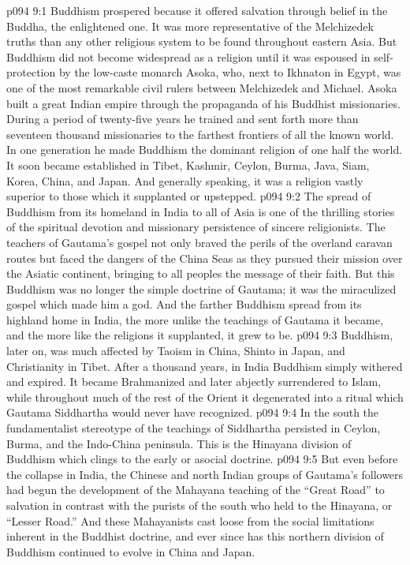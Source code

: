 \vs p094 9:1 Buddhism prospered because it offered salvation through belief in the Buddha, the enlightened one. It was more representative of the Melchizedek truths than any other religious system to be found throughout eastern Asia. But Buddhism did not become widespread as a religion until it was espoused in self\hyp{}protection by the low\hyp{}caste monarch Asoka, who, next to Ikhnaton in Egypt, was one of the most remarkable civil rulers between Melchizedek and Michael. Asoka built a great Indian empire through the propaganda of his Buddhist missionaries. During a period of twenty\hyp{}five years he trained and sent forth more than seventeen thousand missionaries to the farthest frontiers of all the known world. In one generation he made Buddhism the dominant religion of one half the world. It soon became established in Tibet, Kashmir, Ceylon, Burma, Java, Siam, Korea, China, and Japan. And generally speaking, it was a religion vastly superior to those which it supplanted or upstepped.
\vs p094 9:2 The spread of Buddhism from its homeland in India to all of Asia is one of the thrilling stories of the spiritual devotion and missionary persistence of sincere religionists. The teachers of Gautama’s gospel not only braved the perils of the overland caravan routes but faced the dangers of the China Seas as they pursued their mission over the Asiatic continent, bringing to all peoples the message of their faith. But this Buddhism was no longer the simple doctrine of Gautama; it was the miraculized gospel which made him a god. And the farther Buddhism spread from its highland home in India, the more unlike the teachings of Gautama it became, and the more like the religions it supplanted, it grew to be.
\vs p094 9:3 Buddhism, later on, was much affected by Taoism in China, Shinto in Japan, and Christianity in Tibet. After a thousand years, in India Buddhism simply withered and expired. It became Brahmanized and later abjectly surrendered to Islam, while throughout much of the rest of the Orient it degenerated into a ritual which Gautama Siddhartha would never have recognized.
\vs p094 9:4 In the south the fundamentalist stereotype of the teachings of Siddhartha persisted in Ceylon, Burma, and the Indo\hyp{}China peninsula. This is the Hinayana division of Buddhism which clings to the early or asocial doctrine.
\vs p094 9:5 But even before the collapse in India, the Chinese and north Indian groups of Gautama’s followers had begun the development of the Mahayana teaching of the “Great Road” to salvation in contrast with the purists of the south who held to the Hinayana, or “Lesser Road.” And these Mahayanists cast loose from the social limitations inherent in the Buddhist doctrine, and ever since has this northern division of Buddhism continued to evolve in China and Japan.
